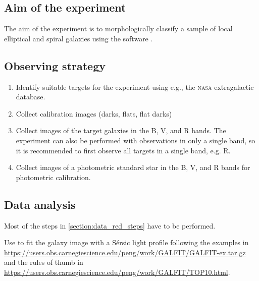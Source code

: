\documentclass[a4paper, 11pt, fleqn]{memoir}
\begin{document}
\subsection{Aim of the experiment}

The aim of the experiment is to morphologically classify a sample of local elliptical and spiral galaxies using the software .

\subsection{Observing strategy}

\begin{enumerate}
    \item Identify suitable targets for the experiment using e.g., the \textsc{nasa} extragalactic database\autocite{NasaExtragalacticDatabaseSearch}.
    \item Collect calibration images (darks, flats, flat darks)
    \item Collect images of the target galaxies in the B, V, and R bands. The experiment can also be performed with observations in only a single band, so it is recommended to first observe all targets in a single band, e.g. R.
    \item Collect images of a photometric standard star in the B, V, and R bands for photometric calibration.
\end{enumerate} 

\subsection{Data analysis}

Most of the steps in \ref{section:data_red_steps} have to be performed.

Use  to fit the galaxy image with a Sérsic light profile following the examples in \url{https://users.obs.carnegiescience.edu/peng/work/GALFIT/GALFIT-ex.tar.gz} and the rules of thumb in \url{https://users.obs.carnegiescience.edu/peng/work/GALFIT/TOP10.html}.
\end{document}
